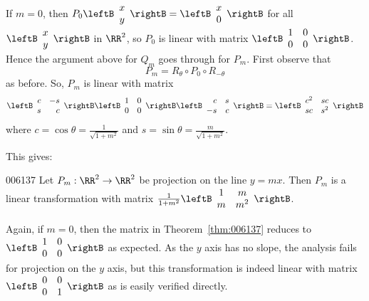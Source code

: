 If $m = 0$, then $P_{0} \leftB \begin{array}{c}
x \\
y
\end{array} \rightB = \leftB \begin{array}{c}
x \\
0
\end{array} \rightB$
 for all $\leftB \begin{array}{c}
 x \\
 y
 \end{array} \rightB$
 in $\RR^2$, so $P_{0}$ is linear with matrix $\leftB \begin{array}{rr}
 1 & 0 \\
 0 & 0
 \end{array} \rightB$.
 Hence the argument above for $Q_{m}$ goes through for $P_{m}$. First observe that
\begin{equation*}
P_{m} = R_{\theta} \circ P_{0} \circ R_{-\theta}
\end{equation*}
as before. So, $P_{m}$ is linear with matrix
\begin{equation*}
\leftB \begin{array}{rr}
c & -s \\
s & c
\end{array} \rightB \leftB \begin{array}{rr}
1 & 0 \\
0 & 0
\end{array} \rightB \leftB \begin{array}{rr}
c & s \\
-s & c
\end{array} \rightB = \leftB \begin{array}{rr}
c^2 & sc \\
sc & s^2
\end{array} \rightB
\end{equation*}
where $c = \cos \theta = \frac{1}{\sqrt{1+ m^2}}$ and $s = \sin \theta = \frac{m}{\sqrt{1+ m^2}}$. 

This gives:
\begin{theorem}{}{006137}
Let $P_{m} : \RR^2 \to \RR^2$ be projection on the line $y = mx$. Then $P_{m}$ is a linear transformation with matrix $\frac{1}{1 + m^2} \leftB \begin{array}{cc}
1 & m \\
m & m^2
\end{array} \rightB$.
\end{theorem}

Again, if $m = 0$, then the matrix in Theorem~\ref{thm:006137} reduces to $\leftB \begin{array}{rr}
1 & 0 \\
0 & 0
\end{array} \rightB$
 as expected. As the $y$ axis has no slope, the analysis fails for projection on the $y$ axis, but this transformation is indeed linear with matrix $\leftB \begin{array}{rr}
 0 & 0 \\
 0 & 1
 \end{array} \rightB$
 as is easily verified directly.

